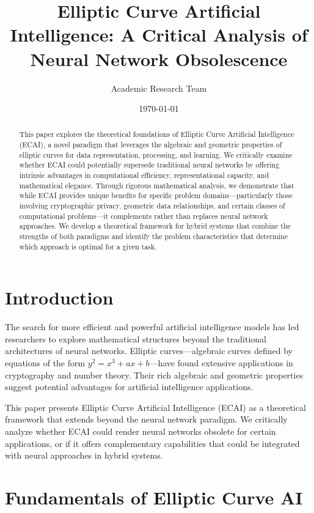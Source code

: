 \documentclass[12pt,a4paper]{article}
\title{Elliptic Curve Artificial Intelligence: A Critical Analysis of Neural Network Obsolescence}
\author{Academic Research Team}
\date{\today}
\theoremstyle{definition}
\begin{document}
\maketitle

\begin{abstract}
This paper explores the theoretical foundations of Elliptic Curve Artificial Intelligence (ECAI), a novel paradigm that leverages the algebraic and geometric properties of elliptic curves for data representation, processing, and learning. We critically examine whether ECAI could potentially supersede traditional neural networks by offering intrinsic advantages in computational efficiency, representational capacity, and mathematical elegance. Through rigorous mathematical analysis, we demonstrate that while ECAI provides unique benefits for specific problem domains—particularly those involving cryptographic privacy, geometric data relationships, and certain classes of computational problems—it complements rather than replaces neural network approaches. We develop a theoretical framework for hybrid systems that combine the strengths of both paradigms and identify the problem characteristics that determine which approach is optimal for a given task.
\end{abstract}

\section{Introduction}
The search for more efficient and powerful artificial intelligence models has led researchers to explore mathematical structures beyond the traditional architectures of neural networks. Elliptic curves—algebraic curves defined by equations of the form $y^2 = x^3 + ax + b$—have found extensive applications in cryptography and number theory. Their rich algebraic and geometric properties suggest potential advantages for artificial intelligence applications.

This paper presents Elliptic Curve Artificial Intelligence (ECAI) as a theoretical framework that extends beyond the neural network paradigm. We critically analyze whether ECAI could render neural networks obsolete for certain applications, or if it offers complementary capabilities that could be integrated with neural approaches in hybrid systems.

\section{Fundamentals of Elliptic Curve AI}
\end{document}
